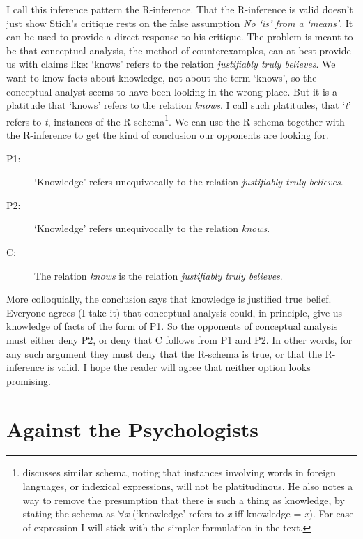 I call this inference pattern the R\nobreakdash-inference. That the R\nobreakdash-inference is valid doesn't just show Stich's critique rests on the false assumption \textit{No `is' from a `means'}. It can be used to provide a direct response to his critique. The problem is meant to be that conceptual analysis, the method of counterexamples, can at best provide us with claims like: `knows' refers to the relation \textit{justifiably truly believes}. We want to know facts about knowledge, not about the term `knows', so the conceptual analyst seems to have been looking in the wrong place. But it is a platitude that `knows' refers to the relation \textit{knows}. I call such platitudes, that `\textit{t}' refers to \textit{t}, instances of the R\nobreakdash-schema\footnote{\cite[115-130]{Horwich1999} discusses similar schema, noting that instances involving words in foreign languages, or indexical expressions, will not be platitudinous. He also notes a way to remove the presumption that there is such a thing as knowledge, by stating the schema as ${\forall}$\textit{x} (`knowledge' refers to \textit{x} iff knowledge = \textit{x}). For ease of expression I will stick with the simpler formulation in the text.}. We can use the R\nobreakdash-schema together with the R\nobreakdash-inference to get the kind of conclusion our opponents are looking for.

\begin{description}
\item[P1:] `Knowledge' refers unequivocally to the relation \textit{justifiably truly believes}.
\item[P2:] `Knowledge' refers unequivocally to the relation \textit{knows}.
\item[C:] The relation \textit{knows} is the relation \textit{justifiably truly believes}.
\end{description}

\noindent More colloquially, the conclusion says that knowledge is justified true belief. Everyone agrees (I take it) that conceptual analysis could, in principle, give us knowledge of facts of the form of P1. So the opponents of conceptual analysis must either deny P2, or deny that C follows from P1 and P2. In other words, for any such argument they must deny that the R\nobreakdash-schema is true, or that the R\nobreakdash-inference is valid. I hope the reader will agree that neither option looks promising.

\section{Against the Psychologists}

